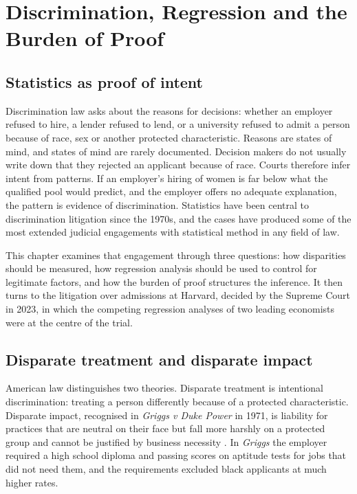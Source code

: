 \chapter{Discrimination, Regression and the Burden of Proof}
\label{ch:discrimination}

\section{Statistics as proof of intent}

Discrimination law asks about the reasons for decisions: whether an employer refused to hire, a lender refused to lend, or a university refused to admit a person because of race, sex or another protected characteristic. Reasons are states of mind, and states of mind are rarely documented. Decision makers do not usually write down that they rejected an applicant because of race. Courts therefore infer intent from patterns. If an employer's hiring of women is far below what the qualified pool would predict, and the employer offers no adequate explanation, the pattern is evidence of discrimination. Statistics have been central to discrimination litigation since the 1970s, and the cases have produced some of the most extended judicial engagements with statistical method in any field of law.

This chapter examines that engagement through three questions: how disparities should be measured, how regression analysis should be used to control for legitimate factors, and how the burden of proof structures the inference. It then turns to the litigation over admissions at Harvard, decided by the Supreme Court in 2023, in which the competing regression analyses of two leading economists were at the centre of the trial.

\section{Disparate treatment and disparate impact}

American law distinguishes two theories. Disparate treatment is intentional discrimination: treating a person differently because of a protected characteristic. Disparate impact, recognised in \emph{Griggs v Duke Power} in 1971, is liability for practices that are neutral on their face but fall more harshly on a protected group and cannot be justified by business necessity \citep{griggs1971}. In \emph{Griggs} the employer required a high school diploma and passing scores on aptitude tests for jobs that did not need them, and the requirements excluded black applicants at much higher rates.

